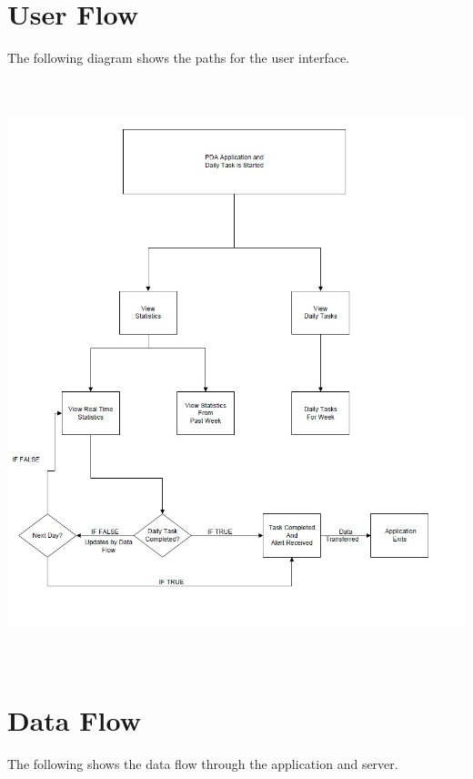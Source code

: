 \documentclass{article}
\begin{document}
\newpage

\section{User Flow}
The following diagram shows the paths for the user interface.

\begin{center}
\includegraphics[width=6in, height=6.67in]{HLDuserFlow.jpg}
\label{fig:userflow}
\end{center}


\newpage

\section{Data Flow}
The following shows the data flow through the application and server.
\end{document}
